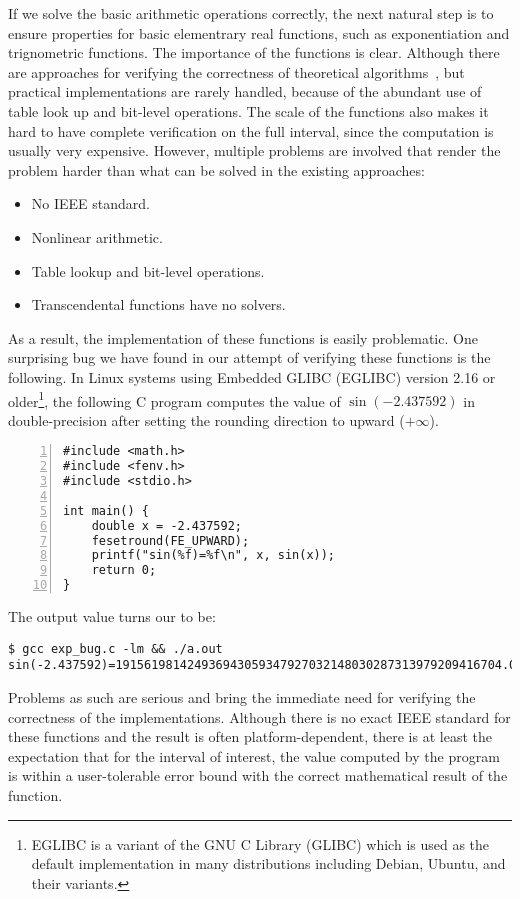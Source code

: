 If we solve the basic arithmetic operations correctly, the next natural step is to ensure properties for basic elementrary real functions, such as exponentiation and trignometric functions. The importance of the functions is clear. Although there are approaches for verifying the correctness of theoretical algorithms~\cite{harrison}, but practical implementations are rarely handled, because of the abundant use of table look up and bit-level operations. The scale of the functions also makes it hard to have complete verification on the full interval, since the computation is usually very expensive. However, multiple problems are involved that render the problem harder than what can be solved in the existing approaches:
\begin{itemize}
\item No IEEE standard.
\item Nonlinear arithmetic. 
\item Table lookup and bit-level operations.  
\item Transcendental functions have no solvers. 
\end{itemize}
As a result, the implementation of these functions is easily problematic. One surprising bug we have found in our attempt of verifying these functions is the following. In Linux systems using Embedded
GLIBC (EGLIBC) version 2.16 or older\footnote{EGLIBC is a variant of the GNU C Library (GLIBC) which is used as the default implementation in many distributions including Debian, Ubuntu, and their variants.}, the following C program computes the value of $\sin(-2.437592)$ in double-precision after setting the rounding direction to upward ($+\infty$).
\begin{Verbatim}[numbers=left, frame=single]
#include <math.h>
#include <fenv.h>
#include <stdio.h>

int main() {
    double x = -2.437592;
    fesetround(FE_UPWARD);
    printf("sin(%f)=%f\n", x, sin(x));
    return 0;
}
\end{Verbatim}
The output value turns our to be: 
\begin{Verbatim}[frame=single]
$ gcc exp_bug.c -lm && ./a.out
sin(-2.437592)=191561981424936943059347927032148030287313979209416704.00000
\end{Verbatim}
Problems as such are serious and bring the immediate need for verifying the correctness of the implementations. Although there is no exact IEEE standard for these functions and the result is often platform-dependent, there is at least the expectation that for the interval of interest, the value computed by the program is within a user-tolerable error bound with the correct mathematical result of the function.

